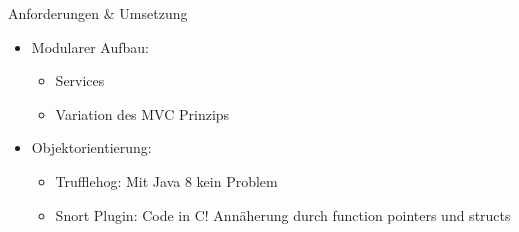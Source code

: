 \begin{frame}{Anforderungen \& Umsetzung}
    \begin{itemize}[<+->]
        
        \item Modularer Aufbau:
        \begin{itemize}
            \item Services
            \item Variation des MVC Prinzips
        \end{itemize}
        
        \item Objektorientierung:
        \begin{itemize}
          \item Trufflehog: Mit Java 8 kein Problem
          \item Snort Plugin: Code in C! Annäherung durch function pointers und structs
        \end{itemize}
    \end{itemize}
\end{frame} 